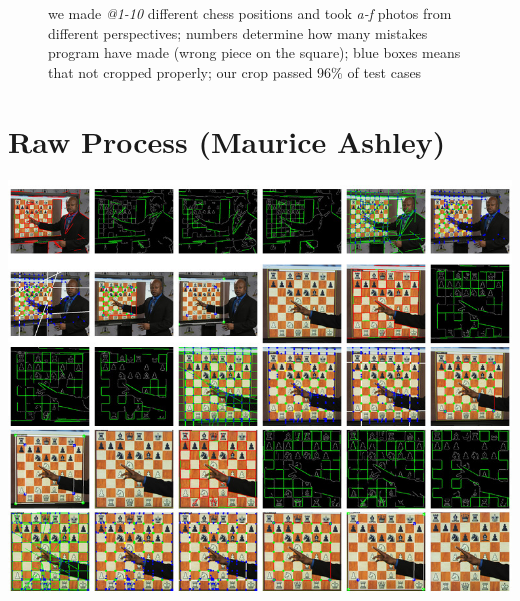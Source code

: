 \documentclass[letterpaper, 12pt]{article}
\begin{document}
\begin{figure}[H]
\centering
{}
\caption{we made \textit{@1-10} different chess positions and took \textit{a-f}
photos from different perspectives; numbers determine how many mistakes program
have made (wrong piece on the square); blue boxes means that not cropped properly;
our crop passed 96\% of test cases}
\end{figure}


\printbibliography[title={References}]


\clearpage\appendix

\section{Raw Process (Maurice Ashley)}

\includegraphics[width=\columnwidth]{appendixA}
\clearpage
\end{document}
